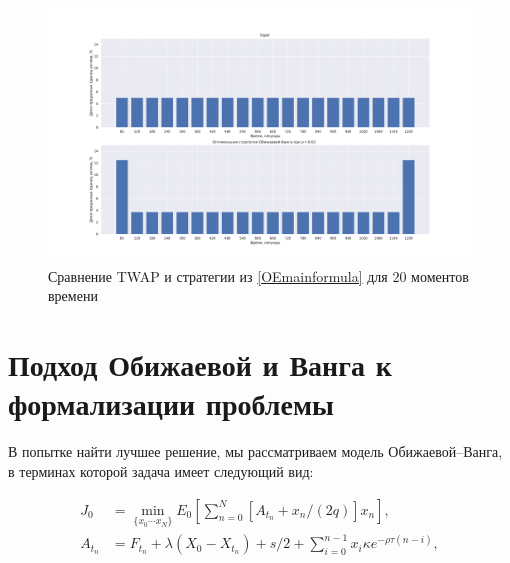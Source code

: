 \begin{figure}
    \includegraphics[scale=0.33]{fig/TWAP_OW.pdf}
    \caption{Сравнение TWAP и стратегии из \ref{OEmainformula} для $20$ моментов времени}
    \label{TWAPOW}
\end{figure}

\section{Подход Обижаевой и Ванга к формализации проблемы}
В попытке найти лучшее решение, мы рассматриваем модель Обижаевой--Ванга,
в терминах которой задача имеет следующий вид: \par
\begin{align*} \label{oEproblem}
    J_0 &= \min _{\{x_0 \cdots x_N \}} E_0 \left[ \sum _{n=0}^N [A_{t_n} + x_n /(2q)] x_n\right],  \\
    A_{t_n} &= F_{t_n} + \lambda (X_0 - X_{t_n}) + s/2 + \sum _{i=0}^{n-1} x_i \kappa e^{- \rho \tau (n - i)},
 \end{align*}
 
